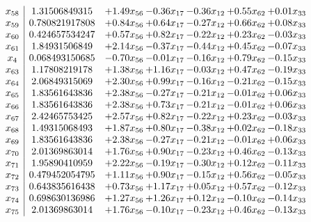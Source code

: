 \documentclass[8pt]{article}
\begin{document}
\[\begin{array}{c| c c@{\hskip 2pt} c@{\hskip 2pt} c@{\hskip 2pt} c@{\hskip 2pt} c@{\hskip 2pt} }
 x_{58}   &  1.31506849315 & +  1.49 x_{56} & -0.36 x_{17} & -0.36 x_{12} & +  0.55 x_{62} & +  0.01 x_{33}\\
 x_{59}   &  0.780821917808 & +  0.84 x_{56} & +  0.64 x_{17} & -0.27 x_{12} & +  0.66 x_{62} & +  0.08 x_{33}\\
 x_{60}   &  0.424657534247 & +  0.57 x_{56} & +  0.82 x_{17} & -0.22 x_{12} & +  0.23 x_{62} & -0.03 x_{33}\\
 x_{61}   &  1.84931506849 & +  2.14 x_{56} & -0.37 x_{17} & -0.44 x_{12} & +  0.45 x_{62} & -0.07 x_{33}\\
 x_{4}   &  0.068493150685 & -0.70 x_{56} & -0.01 x_{17} & -0.16 x_{12} & +  0.79 x_{62} & -0.15 x_{33}\\
 x_{63}   &  1.17808219178 & +  1.38 x_{56} & +  1.16 x_{17} & -0.03 x_{12} & +  0.47 x_{62} & -0.19 x_{33}\\
 x_{64}   &  2.06849315069 & +  2.30 x_{56} & +  0.99 x_{17} & -0.16 x_{12} & -0.21 x_{62} & -0.15 x_{33}\\
 x_{65}   &  1.83561643836 & +  2.38 x_{56} & -0.27 x_{17} & -0.21 x_{12} & -0.01 x_{62} & +  0.06 x_{33}\\
 x_{66}   &  1.83561643836 & +  2.38 x_{56} & +  0.73 x_{17} & -0.21 x_{12} & -0.01 x_{62} & +  0.06 x_{33}\\
 x_{67}   &  2.42465753425 & +  2.57 x_{56} & +  0.82 x_{17} & -0.22 x_{12} & +  0.23 x_{62} & -0.03 x_{33}\\
 x_{68}   &  1.49315068493 & +  1.87 x_{56} & +  0.80 x_{17} & -0.38 x_{12} & +  0.02 x_{62} & -0.18 x_{33}\\
 x_{69}   &  1.83561643836 & +  2.38 x_{56} & -0.27 x_{17} & -0.21 x_{12} & -0.01 x_{62} & +  0.06 x_{33}\\
 x_{70}   &  2.01369863014 & +  1.76 x_{56} & +  0.90 x_{17} & -0.23 x_{12} & +  0.46 x_{62} & -0.13 x_{33}\\
 x_{71}   &  1.95890410959 & +  2.22 x_{56} & -0.19 x_{17} & -0.30 x_{12} & +  0.12 x_{62} & -0.11 x_{33}\\
 x_{72}   &  0.479452054795 & +  1.11 x_{56} & +  0.90 x_{17} & -0.15 x_{12} & +  0.56 x_{62} & -0.05 x_{33}\\
 x_{73}   &  0.643835616438 & +  0.73 x_{56} & +  1.17 x_{17} & +  0.05 x_{12} & +  0.57 x_{62} & -0.12 x_{33}\\
 x_{74}   &  0.698630136986 & +  1.27 x_{56} & +  1.26 x_{17} & +  0.12 x_{12} & -0.10 x_{62} & -0.14 x_{33}\\
 x_{75}   &  2.01369863014 & +  1.76 x_{56} & -0.10 x_{17} & -0.23 x_{12} & +  0.46 x_{62} & -0.13 x_{33}\\

\end{array}\]
\end{document}
